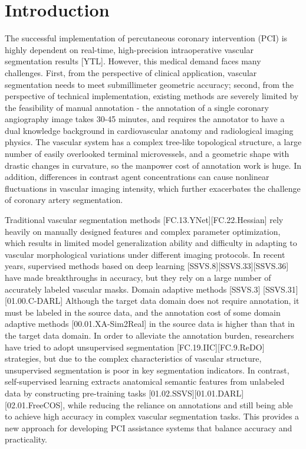 \section{Introduction}
\label{sec:intro}

The successful implementation of percutaneous coronary intervention (PCI) is highly dependent on real-time, high-precision intraoperative vascular segmentation results [YTL]. However, this medical demand faces many challenges. First, from the perspective of clinical application, vascular segmentation needs to meet submillimeter geometric accuracy; second, from the perspective of technical implementation, existing methods are severely limited by the feasibility of manual annotation - the annotation of a single coronary angiography image takes 30-45 minutes, and requires the annotator to have a dual knowledge background in cardiovascular anatomy and radiological imaging physics. The vascular system has a complex tree-like topological structure, a large number of easily overlooked terminal microvessels, and a geometric shape with drastic changes in curvature, so the manpower cost of annotation work is huge. In addition, differences in contrast agent concentrations can cause nonlinear fluctuations in vascular imaging intensity, which further exacerbates the challenge of coronary artery segmentation.


Traditional vascular segmentation methods [FC.13.YNet][FC.22.Hessian] rely heavily on manually designed features and complex parameter optimization, which results in limited model generalization ability and difficulty in adapting to vascular morphological variations under different imaging protocols. In recent years, supervised methods based on deep learning [SSVS.8][SSVS.33][SSVS.36] have made breakthroughs in accuracy, but they rely on a large number of accurately labeled vascular masks. Domain adaptive methods [SSVS.3] [SSVS.31][01.00.C-DARL] Although the target data domain does not require annotation, it must be labeled in the source data, and the annotation cost of some domain adaptive methods [00.01.XA-Sim2Real] in the source data is higher than that in the target data domain. In order to alleviate the annotation burden, researchers have tried to adopt unsupervised segmentation [FC.19.IIC][FC.9.ReDO] strategies, but due to the complex characteristics of vascular structure, unsupervised segmentation is poor in key segmentation indicators. In contrast, self-supervised learning extracts anatomical semantic features from unlabeled data by constructing pre-training tasks [01.02.SSVS][01.01.DARL][02.01.FreeCOS], while reducing the reliance on annotations and still being able to achieve high accuracy in complex vascular segmentation tasks. This provides a new approach for developing PCI assistance systems that balance accuracy and practicality.

